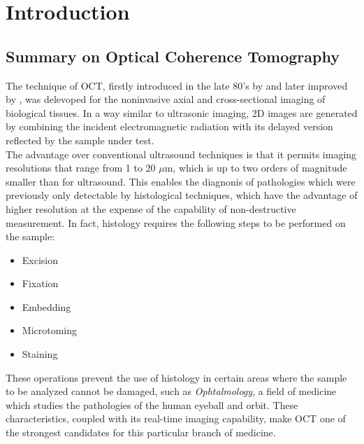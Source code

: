 
\chapter{Introduction} %
\label{ch:introduction} %

\section{Summary on Optical Coherence Tomography}
\label{sec:intro}

The technique of \acf{OCT}, firstly introduced in the late 80's by \citeauthor{Fujimoto1986} \cite{Fujimoto1986} and later improved by \citeauthor{Huang1991} \cite{Huang1991}, was delevoped for the noninvasive axial and cross-sectional imaging of biological tissues.
In a way similar to ultrasonic imaging, 2D images are generated by combining the incident electromagnetic radiation with its delayed version reflected by the sample under test.\\



The advantage over conventional ultrasound techniques is that it permits imaging resolutions
that range from 1 to 20 $\mu$m, which is up to two orders of magnitude smaller than for ultrasound. This enables the diagnonis of pathologies which were previously only detectable by histological techniques, which have the advantage of higher resolution at the expense of the capability of non-destructive measurement. In fact, histology requires the following steps to be performed on the sample:
\begin{itemize}
    \item Excision
    \item Fixation
    \item Embedding
    \item Microtoming
    \item Staining
\end{itemize}

These operations prevent the use of histology in certain areas where the sample to be analyzed cannot be damaged, such as \emph{Ophtalmology}, a field of medicine which studies the pathologies of the human eyeball and orbit. These characteristics, coupled with its real-time imaging capability, make \ac{OCT} one of the strongest candidates for this particular branch of medicine. 

